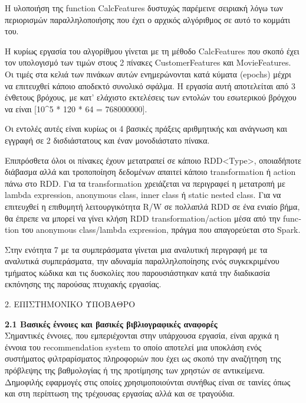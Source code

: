 \documentclass{report}
\begin{document}
Η  υλοποιήση της \textlatin{function CalcFeatures} δυστυχώς παρέμεινε σειριακή λόγω των περιορισμών παραλληλοποιήσης που έχει ο αρχικός αλγόριθμος σε αυτό το κομμάτι του.  
    
 Η κυρίως εργασία του αλγορίθμου γίνεται με τη μέθοδο \textlatin{CalcFeatures} που σκοπό έχει τον υπολογισμό των τιμών στους 2 πίνακες \textlatin{CustomerFeatures} και \textlatin{MovieFeatures}. Οι τιμές στα κελιά των πινάκων αυτών ενημερώνονται κατά κύματα \textlatin{(epochs) }μέχρι να επιτευχθεί κάποιο αποδεκτό συνολικό σφάλμα. Η εργασία αυτή αποτελείται από 3 ένθετους βρόχους, με κατ' ελάχιστο εκτελέσεις των εντολών του εσωτερικού βρόγχου να είναι [10^5 * 120 * 64 = 768000000]. 
 
  Οι εντολές αυτές είναι κυρίως οι 4 βασικές πράξεις αριθμητικής και ανάγνωση και εγγραφή σε 2 δισδιάστατους και έναν μονοδιάστατο πίνακα.
  
  Επιπρόσθετα όλοι οι πίνακες έχουν μετατραπεί σε κάποιο \textlatin{RDD<Type>}, οποιαδήποτε διάβασμα αλλά και τροποποίηση δεδομένων απαιτεί κάποιο \textlatin{transformation} ή \textlatin{action} πάνω στο \textlatin{RDD}. Για τα \textlatin{transformation} χρειάζεται να περιγραφεί η μετατροπή με \textlatin{lambda expression, anonymous class, inner class} ή \textlatin{static nested class}. Για να επιτευχθεί η επιθυμητή λειτουργικότητα \textlatin{R/W} σε πολλαπλά \textlatin{RDD} σε ένα ενιαίο βήμα, θα έπρεπε να μπορεί να γίνει κλήση \textlatin{RDD transformation/action} μέσα από την \textlatin{function} του \textlatin{anonymous class/lambda expression,} πράγμα που απαγορεύεται στο \textlatin{Spark}. 
 
 Στην ενότητα 7 με τα συμπεράσματα γίνεται μια αναλυτική περιγραφή με τα αναλυτικά συμπεράσματα, την αδυναμία παραλληλοποίησης ενός συγκεκριμένου τμήματος κώδικα και τις δυσκολίες που παρουσιάστηκαν κατά την διαδικασία εκπόνησης της παρούσας πτυχιακής εργασίας.
 

\newpage

\begin{center}
\LARGE{2. ΕΠΙΣΤΗΜΟΝΙΚΟ ΥΠΟΒΑΘΡΟ}
\end{center}

\vspace{5mm}

\textbf{\large{2.1 Βασικές έννοιες και βασικές βιβλιογραφικές αναφορές}}
\vspace{2mm}
\\
Σημαντικές έννοιες, που εμπεριέχονται στην υπάρχουσα εργασία, είναι αρχικά η έννοια του \textlatin{recommendation system} το οποίο αποτελεί μια υποκλάση ενός συστήματος φιλτραρίσματος πληροφοριών που έχει ως σκοπό την αναζήτηση της πρόβλεψης της βαθμολογίας ή της προτίμησης των χρηστών σε αντικείμενα. Δημοφιλής εφαρμογές στις οποίες χρησιμοποιούνται συνήθως είναι σε ταινίες όπως και στη περίπτωση της τρέχουσας εργασίας αλλά και σε τραγούδια.  
\end{document}
